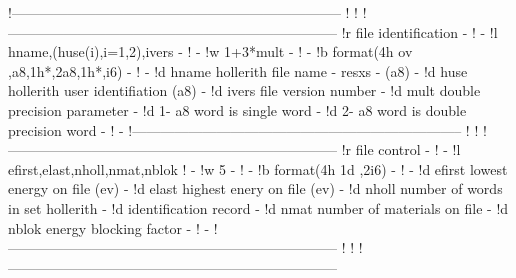 \begin{ccode}
!-----------------------------------------------------------------------
!
!
!-----------------------------------------------------------------------
!r           file identification                                       -
!                                                                      -
!l    hname,(huse(i),i=1,2),ivers                                      -
!                                                                      -
!w    1+3*mult                                                         -
!                                                                      -
!b    format(4h ov ,a8,1h*,2a8,1h*,i6)                                 -
!                                                                      -
!d    hname         hollerith file name  - resxs -  (a8)               -
!d    huse          hollerith user identifiation    (a8)               -
!d    ivers         file version number                                -
!d    mult          double precision parameter                         -
!d                       1- a8 word is single word                     -
!d                       2- a8 word is double precision word           -
!                                                                      -
!-----------------------------------------------------------------------
!
!
!-----------------------------------------------------------------------
!r           file control                                              -
!                                                                      -
!l    efirst,elast,nholl,nmat,nblok
!                                                                      -
!w    5                                                                -
!                                                                      -
!b    format(4h 1d ,2i6)                                               -
!                                                                      -
!d    efirst      lowest energy on file (ev)                           -
!d    elast       highest enery on file (ev)                           -
!d    nholl       number of words in set hollerith                     -
!d                    identification record                            -
!d    nmat        number of materials on file                          -
!d    nblok       energy blocking factor                               -
!                                                                      -
!-----------------------------------------------------------------------
!
!
!-----------------------------------------------------------------------

\end{ccode}
